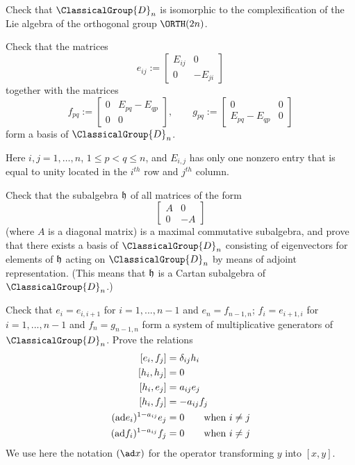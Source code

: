 \begin{exercise}
Check that $\ClassicalGroup{D}_{n}$ is isomorphic to the complexification of the
Lie algebra of the orthogonal group $\ORTH(2n)$.
\end{exercise}
\begin{exercise}
Check that the matrices
\begin{equation}
e_{ij}:=\begin{bmatrix}E_{ij}&0\\
0&-E_{ji}
\end{bmatrix}
\end{equation}
together with the matrices
\begin{equation}
f_{pq}:=\begin{bmatrix}0&E_{pq}-E_{qp}\\
0&0
\end{bmatrix},\qquad
g_{pq}:=\begin{bmatrix}0&0\\
E_{pq}-E_{qp}&0
\end{bmatrix}
\end{equation}
form a basis of $\ClassicalGroup{D}_{n}$. 

Here $i,j=1,\ldots,n$, $1\leq p<q\leq n$, and $E_{i,j}$ has only
one nonzero entry that is equal to unity located in the $i^{th}$
row and $j^{th}$ column.
\end{exercise}
\begin{exercise}
Check that the subalgebra $\frak{h}$ of all matrices of the form
\begin{equation}
\begin{bmatrix}
A&0\\
0&-A
\end{bmatrix}
\end{equation}
(where $A$ is a diagonal matrix) is a maximal commutative
subalgebra, and prove that there exists a basis of $\ClassicalGroup{D}_{n}$
consisting of eigenvectors for elements of $\frak{h}$ acting on
$\ClassicalGroup{D}_{n}$ by means of adjoint representation. (This means that
$\frak{h}$ is a Cartan subalgebra of $\ClassicalGroup{D}_{n}$.)
\end{exercise}
\begin{exercise}
Check that $e_{i}=e_{i,i+1}$ for $i=1,...,n-1$ and
$e_{n}=f_{n-1,n}$; $f_{i}=e_{i+1,i}$ for $i=1,...,n-1$ and
$f_{n}=g_{n-1,n}$ form a system of multiplicative generators of
$\ClassicalGroup{D}_{n}$. Prove the relations
\begin{subequations}
\begin{align}
[e_{i},f_{j}]&=\delta_{ij}h_{i}\\
[h_{i},h_{j}]&=0\\
[h_{i},e_{j}]&=a_{ij}e_{j}\\
[h_{i},f_{j}]&=-a_{ij}f_{j}\\
({\rm ad}e_{i})^{1-a_{ij}}e_{j}&=0\qquad\mbox{when $i\not=j$}\\
({\rm ad}f_{i})^{1-a_{ij}}f_{j}&=0\qquad\mbox{when $i\not=j$}
\end{align}
\end{subequations}
We use here the notation $(\ad x)$ for the operator transforming $y$ into $[x,y]$.
\end{exercise}

